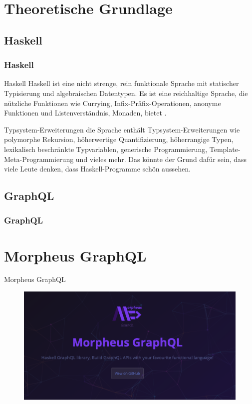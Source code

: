 
\section{Theoretische Grundlage}

\subsection{Haskell}
\begin{frame}{}
    \frametitle{Haskell}
\end{frame}

\begin{frame}{}

    \footnotesize

    \begin{block}{Haskell}
        Haskell ist eine nicht strenge, rein funktionale Sprache mit statischer Typisierung und algebraischen Datentypen. Es ist eine reichhaltige Sprache, die nützliche Funktionen wie Currying, Infix-Präfix-Operationen, anonyme Funktionen und Listenverständnis, Monaden, bietet \cite{history-of-haskell}.

    \end{block}

    \begin{block}{Typsystem-Erweiterungen}
    die Sprache enthält Typsystem-Erweiterungen wie polymorphe Rekursion, höherwertige Quantifizierung, höherrangige Typen, lexikalisch beschränkte Typvariablen, generische Programmierung, Template-Meta-Programmierung und vieles mehr. Das könnte der Grund dafür sein, dass viele Leute denken, dass Haskell-Programme schön aussehen. \cite{history-of-haskell} 
    \end{block}

\end{frame}


\subsection{GraphQL}
\begin{frame}{}
    \frametitle{GraphQL}
\end{frame}


\section{Morpheus GraphQL}
\begin{frame}{Morpheus GraphQL}
    \begin{figure}
        \centering
        \includegraphics[width=1.1\textwidth]{assets/img/morpheus-graphql-bg.png}
    \end{figure}
\end{frame}